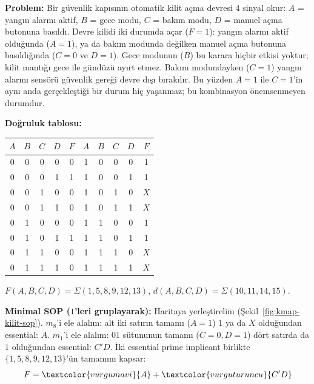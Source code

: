\begin{ornek}\label{orn:dontcare-kilit}
\textbf{Problem:} Bir güvenlik kapısının otomatik kilit açma devresi $4$ sinyal
okur: $A$ = yangın alarmı aktif, $B$ = gece modu, $C$ = bakım modu, $D$ = manuel
açma butonuna basıldı. Devre kilidi iki durumda açar ($F=1$): yangın alarmı
aktif olduğunda ($A=1$), ya da bakım modunda değilken manuel açma butonuna
basıldığında ($C=0$ ve $D=1$). Gece modunun ($B$) bu karara hiçbir etkisi
yoktur; kilit mantığı gece ile gündüzü ayırt etmez. Bakım modundayken ($C=1$)
yangın alarmı sensörü güvenlik gereği devre dışı bırakılır. Bu yüzden $A=1$
ile $C=1$'in aynı anda gerçekleştiği bir durum hiç yaşanmaz; bu kombinasyon
önemsenmeyen durumdur.

\textbf{Doğruluk tablosu:}
\begin{center}
\begin{tabular}{cccc|c||cccc|c}
\toprule
$A$&$B$&$C$&$D$&$F$ & $A$&$B$&$C$&$D$&$F$\\
\midrule
0&0&0&0&0 & 1&0&0&0&1\\
0&0&0&1&1 & 1&0&0&1&1\\
0&0&1&0&0 & 1&0&1&0&$X$\\
0&0&1&1&0 & 1&0&1&1&$X$\\
0&1&0&0&0 & 1&1&0&0&1\\
0&1&0&1&1 & 1&1&0&1&1\\
0&1&1&0&0 & 1&1&1&0&$X$\\
0&1&1&1&0 & 1&1&1&1&$X$\\
\bottomrule
\end{tabular}
\end{center}
$F(A,B,C,D)=\Sigma(1,5,8,9,12,13)$, $d(A,B,C,D)=\Sigma(10,11,14,15)$.

\textbf{Minimal SOP ($1$'leri gruplayarak):} Haritaya yerleştirelim
(Şekil~\ref{fig:kmap-kilit-sop}). $m_8$'i ele alalım: alt iki satırın tamamı
($A=1$) $1$ ya da $X$ olduğundan essential: $A$. $m_1$'i ele alalım: $01$
sütununun tamamı ($C=0,D=1$) dört satırda da $1$ olduğundan essential: $C'D$.
İki essential prime implicant birlikte $\{1,5,8,9,12,13\}$'ün tamamını kapsar:
\[
F = \textcolor{vurgumavi}{A} + \textcolor{vurguturuncu}{C'D}
\]


\end{ornek}
